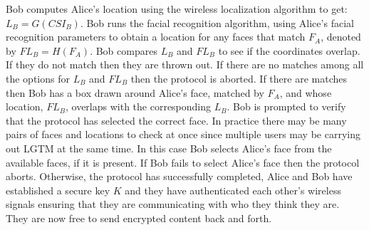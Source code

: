 \documentclass[12pt]{report}
\begin{document}
Bob computes Alice's location using the wireless localization algorithm to get: $L_{B} = G(CSI_{B})$. Bob runs the facial recognition algorithm, using Alice's facial recognition parameters to obtain a location for any faces that match $F_{A}$, denoted by $FL_{B} = H(F_{A})$. Bob compares $L_{B}$ and $FL_{B}$ to see if the coordinates overlap. If they do not match then they are thrown out. If there are no matches among all the options for $L_{B}$ and $FL_{B}$ then the protocol is aborted. If there are matches then Bob has a box drawn around Alice's face, matched by $F_{A}$, and whose location, $FL_{B}$, overlaps with the corresponding $L_{B}$. Bob is prompted to verify that the protocol has selected the correct face. In practice there may be many pairs of faces and locations to check at once since multiple users may be carrying out LGTM at the same time. In this case Bob selects Alice's face from the available faces, if it is present. If Bob fails to select Alice's face then the protocol aborts. Otherwise, the protocol has successfully completed, Alice and Bob have established a secure key $K$ and they have authenticated each other's wireless signals ensuring that they are communicating with who they think they are. They are now free to send encrypted content back and forth. \par
\end{document}
